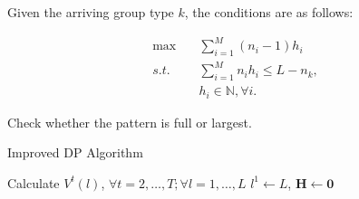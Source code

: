 

\newpage




Given the arriving group type $k$, the conditions are as follows:

\begin{equation}\label{dp_pattern}
  \begin{aligned}
    \max & \quad \sum_{i=1}^{M} (n_i - 1) h_i \\
	  s.t. & \quad \sum_{i=1}^{M} n_{i} h_{i} \leq L - n_k, \\
         & \quad h_i \in \mathbb{N}, \forall i.
  \end{aligned}
\end{equation}

Check whether the pattern is full or largest.


\begin{algorithm}[H]
  \caption{Improved DP Algorithm}
  Calculate $V^{t}(l)$, $\forall t =2, \ldots, T; \forall l = 1, \ldots, L$\;
  $l^{1} \gets L$, $\bm{H} \gets \bm{0}$\;
\end{algorithm}
